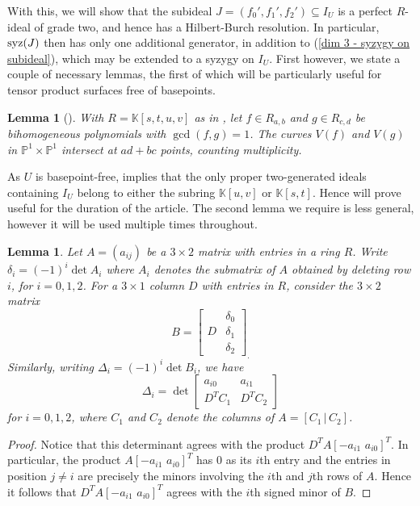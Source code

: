 \documentclass[reqno]{amsart}
\newtheorem{lemma}[thm]{Lemma}
\numberwithin{equation}{section}
\theoremstyle{definition}
\def\K{\mathbb{K}}
\def\P{\mathbb{P}}
\def\syz{\mathop{\rm syz}}
\begin{document}
With this, we will show that the subideal $J=(f_0',f_1',f_2')\subseteq I_U$ is a perfect $R$-ideal of grade two, and hence has a Hilbert-Burch resolution. In particular, $\syz(J)$ then has only one additional generator, in addition to (\ref{dim 3 - syzygy on subideal}), which may be extended to a syzygy on $I_U$. First however, we state a couple of necessary lemmas, the first of which will be particularly useful for tensor product surfaces free of basepoints.





\begin{lemma}[{\cite[V.1.4.3]{Hartshorne}}]\label{Hartshorne lemma}
With $R=\K[s,t,u,v]$ as in , let $f\in R_{a,b}$ and $g\in R_{c,d}$ be bihomogeneous polynomials with $\gcd(f,g)=1$. The curves $V(f)$ and $V(g)$ in $\P^1\times \P^1$ intersect at $ad+bc$ points, counting multiplicity.
\end{lemma}

As $U$ is basepoint-free,  implies that the only proper two-generated ideals containing $I_U$ belong to either the subring $\K[u,v]$ or $\K[s,t]$. Hence  will prove useful for the duration of the article. The second lemma we require is less general, however it will be used multiple times throughout. 




\begin{lemma}\label{Linear algebra lemma - minors of minors}
Let $A=(a_{ij})$ be a $3\times 2$ matrix with entries in a ring $R$. Write $\delta_i = (-1)^i\det A_i$ where $A_i$ denotes the submatrix of $A$ obtained by deleting row $i$, for $i=0,1,2$. For a $3\times 1$ column $D$ with entries in $R$, consider the $3\times 2$ matrix
\[
B=\left[\begin{array}{c|c}
    & \delta_0  \\
    D&\delta_1 \\
    &\delta_2
\end{array}\right]_.
\]
Similarly, writing $\Delta_i = (-1)^i\det B_i$, we have
\[
\Delta_i = \det \left[\begin{array}{cc}
    a_{i0} & a_{i1} \\[0.5ex]
    D^TC_1 & D^TC_2 
\end{array}\right]
\]
for $i=0,1,2$, where $C_1$ and $C_2$ denote the columns of $A=[C_1\,|\,C_2]$.
\end{lemma}


\begin{proof}
Notice that this determinant agrees with the product $D^T A[-a_{i1}\,\,a_{i0}]^T$. In particular, the product $A[-a_{i1}\,\,a_{i0}]^T$ has $0$ as its $i$th entry and the entries in position $j\neq i$ are precisely the minors involving the $i$th and $j$th rows of $A$. Hence it follows that $D^T A[-a_{i1}\,\,a_{i0}]^T$ agrees with the $i$th signed minor of $B$.
\end{proof}
\end{document}
